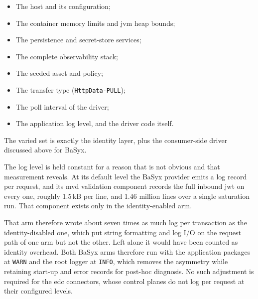 \begin{itemize}[leftmargin=*, itemsep=1pt, topsep=4pt]
    \item The host and its configuration;
    \item The container memory limits and \gls{jvm} heap bounds;
    \item The persistence and secret-store services;
    \item The complete observability stack;
    \item The seeded asset and policy;
    \item The transfer type (\texttt{HttpData-PULL});
    \item The poll interval of the driver;
    \item The application log level, and the driver code itself.
\end{itemize}

The varied set is exactly the identity layer, plus the consumer-side driver discussed above for BaSyx.

The log level is held constant for a reason that is not obvious and that measurement reveals. At its default level the BaSyx provider emits a log record per request, and its \gls{mvd} validation component records the full inbound \gls{jwt} on every one, roughly 1.5\,kB per line, and 1.46 million lines over a single saturation run. That component exists only in the identity-enabled arm.

That arm therefore wrote about seven times as much log per transaction as the identity-disabled one, which put string formatting and log I/O on the request path of one arm but not the other. Left alone it would have been counted as identity overhead. Both BaSyx arms therefore run with the application packages at \texttt{WARN} and the root logger at \texttt{INFO}, which removes the asymmetry while retaining start-up and error records for post-hoc diagnosis. No such adjustment is required for the \gls{edc} connectors, whose control planes do not log per request at their configured levels.

